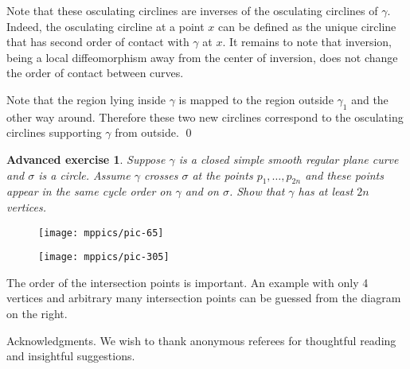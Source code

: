 \documentclass{article}
\theoremstyle{theorem}
\newtheorem*{advancedexercise}{Advanced exercise}
\theoremstyle{definition}
\begin{document}
Note that these osculating circlines are inverses of the osculating circlines of $\gamma$.
Indeed, the osculating circline at a point $x$ can be defined as the unique circline that has second order of contact with $\gamma$ at $x$.
It remains to note that inversion, being a local diffeomorphism away from the center of inversion, does not change the order of contact between curves.

Note that the region lying inside $\gamma$ is mapped to the region outside $\gamma_1$ and the other way around.
Therefore these two new circlines correspond to the osculating circlines supporting $\gamma$ from outside.
\qed

\begin{advancedexercise}\label{ex:curve-crosses-circle}
Suppose $\gamma$ is a closed simple smooth regular plane curve and $\sigma$ is a circle.
Assume $\gamma$ crosses $\sigma$ at the points $p_1,\dots,p_{2 n}$ and these points appear in the same cycle order on $\gamma$ and on $\sigma$.
Show that $\gamma$ has at least $2 n$ vertices.
\end{advancedexercise}

\begin{figure}[!ht]
\begin{minipage}{.48\textwidth}
\centering
\texttt{[image: mppics/pic-65]}
\end{minipage}\hfill
\begin{minipage}{.48\textwidth}
\centering
\texttt{[image: mppics/pic-305]}
\end{minipage}
\end{figure}

The order of the intersection points is important. 
An example with only 4 vertices and arbitrary many intersection points can be guessed from the diagram on the right. 

\begin{acknowledgment}{Acknowledgments.}
We wish to thank anonymous referees for thoughtful reading and insightful suggestions.
\end{acknowledgment}
\end{document}
